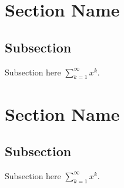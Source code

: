 \documentclass[12pt]{article}
\begin{document}
\section{Section Name}

\subsection{Subsection}
Subsection here $\displaystyle \sum_{k=1}^{\infty}x^{k}$.


\section{Section Name}

\subsection{Subsection}
Subsection here $\displaystyle \sum_{k=1}^{\infty}x^{k}$.



\end{document}
